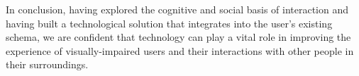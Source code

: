 In conclusion, having explored the cognitive and social basis of interaction and having built a technological solution that integrates into the user's existing schema, we are confident that technology can play a vital role in improving the experience of visually-impaired users and their interactions with other people in their surroundings.
\begin{acks}
\end{acks}
